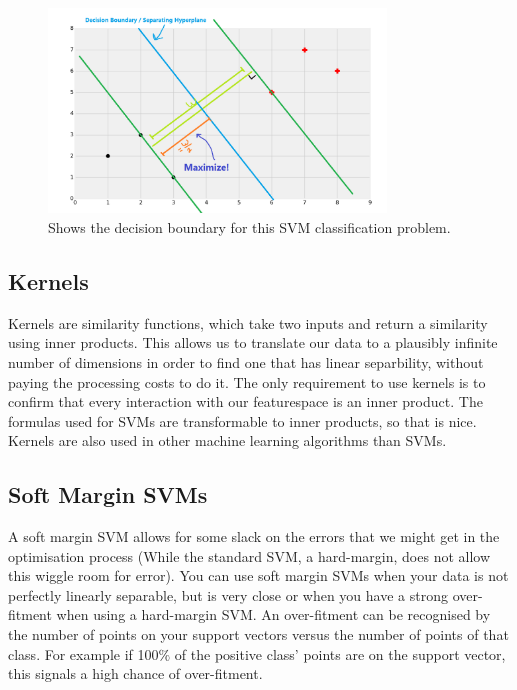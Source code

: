\begin{figure}
\centering
\includegraphics[width=0.8\textwidth]{images/svm-decision-boundary.png}
\caption{\label{fig:svm-decision-boundary} Shows the decision boundary for this SVM classification problem.}
\end{figure}

\subsection{Kernels}\label{sub:kernel}
Kernels are similarity functions, which take two inputs and return a similarity using inner products. This allows us to translate our data to a plausibly infinite number of dimensions in order to find one that has linear separbility, without paying the processing costs to do it. The only requirement to use kernels is to confirm that every interaction with our featurespace is an inner product. The formulas used for SVMs are transformable to inner products, so that is nice. %
Kernels are also used in other machine learning algorithms than SVMs.


\subsection{Soft Margin SVMs}
A soft margin SVM allows for some slack on the errors that we might get in the optimisation process (While the standard SVM, a hard-margin, does not allow this wiggle room for error). You can use soft margin SVMs when your data is not perfectly linearly separable, but is very close or when you have a strong over-fitment when using a hard-margin SVM. An over-fitment can be recognised by the number of points on your support vectors versus the number of points of that class. For example if 100$\%$ of the positive class' points are on the support vector, this signals a high chance of over-fitment.
\\\\

